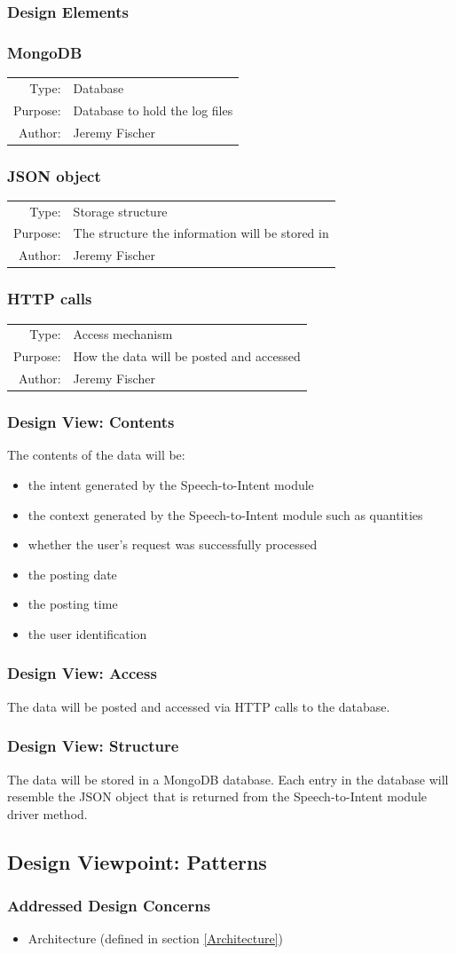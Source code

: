 \documentclass[onecolumn, draftclsnofoot,10pt, compsoc]{IEEEtran}
\newcommand{\designConcernRef}[1]{
    #1 (defined in section \ref{#1})
}
\newcommand{\designElementDef}[4]{
    \subsubsection{#1}\label{#1}
        \begin{tabular}[t]{r p{6in}}
            Type: & #2 \\
            Purpose: & #3 \\
            Author: & #4 \\
        \end{tabular}
}
\begin{document}
	\subsubsection{Design Elements}
	\designElementDef{MongoDB}{Database}{Database to hold the log files}{Jeremy Fischer}
	\designElementDef{JSON object}{Storage structure}{The structure the information will be stored in}{Jeremy Fischer}
	\designElementDef{HTTP calls}{Access mechanism}{How the data will be posted and accessed}{Jeremy Fischer}

	\subsubsection{Design View: Contents}
	The contents of the data will be:
	\begin{itemize}
		\item the intent generated by the Speech-to-Intent module
		\item the context generated by the Speech-to-Intent module such as quantities
		\item whether the user's request was successfully processed
		\item the posting date
		\item the posting time
		\item the user identification
	\end{itemize}

	\subsubsection{Design View: Access}
	The data will be posted and accessed via HTTP calls to the database.

	\subsubsection{Design View: Structure}
	The data will be stored in a MongoDB database.
	Each entry in the database will resemble the JSON object that is returned from the Speech-to-Intent module driver method.



	\subsection{Design Viewpoint: Patterns}
	\subsubsection{Addressed Design Concerns}
	\begin{itemize}
		\item \designConcernRef{Architecture}
	\end{itemize}
\end{document}
